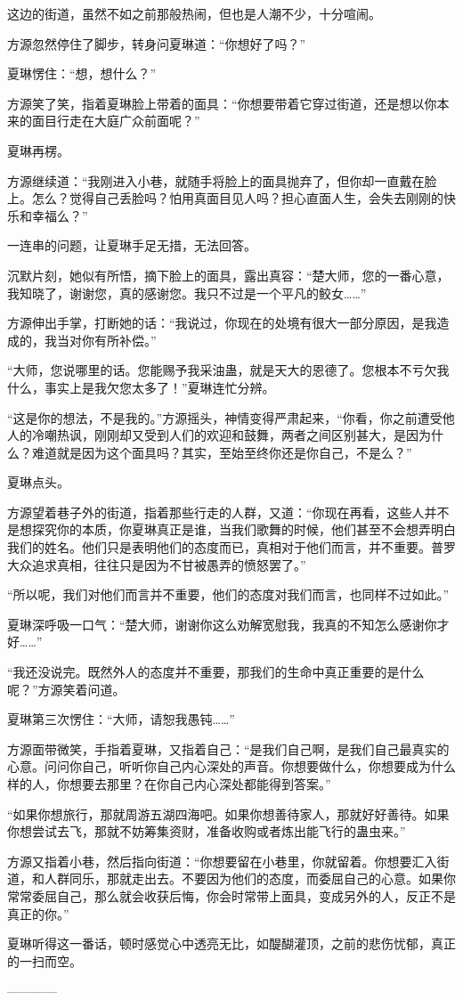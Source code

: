 \begin{this_body}
这边的街道，虽然不如之前那般热闹，但也是人潮不少，十分喧闹。

方源忽然停住了脚步，转身问夏琳道：“你想好了吗？”

夏琳愣住：“想，想什么？”

方源笑了笑，指着夏琳脸上带着的面具：“你想要带着它穿过街道，还是想以你本来的面目行走在大庭广众前面呢？”

夏琳再楞。

方源继续道：“我刚进入小巷，就随手将脸上的面具抛弃了，但你却一直戴在脸上。怎么？觉得自己丢脸吗？怕用真面目见人吗？担心直面人生，会失去刚刚的快乐和幸福么？”

一连串的问题，让夏琳手足无措，无法回答。

沉默片刻，她似有所悟，摘下脸上的面具，露出真容：“楚大师，您的一番心意，我知晓了，谢谢您，真的感谢您。我只不过是一个平凡的鲛女……”

方源伸出手掌，打断她的话：“我说过，你现在的处境有很大一部分原因，是我造成的，我当对你有所补偿。”

“大师，您说哪里的话。您能赐予我采油蛊，就是天大的恩德了。您根本不亏欠我什么，事实上是我欠您太多了！”夏琳连忙分辨。

“这是你的想法，不是我的。”方源摇头，神情变得严肃起来，“你看，你之前遭受他人的冷嘲热讽，刚刚却又受到人们的欢迎和鼓舞，两者之间区别甚大，是因为什么？难道就是因为这个面具吗？其实，至始至终你还是你自己，不是么？”

夏琳点头。

方源望着巷子外的街道，指着那些行走的人群，又道：“你现在再看，这些人并不是想探究你的本质，你夏琳真正是谁，当我们歌舞的时候，他们甚至不会想弄明白我们的姓名。他们只是表明他们的态度而已，真相对于他们而言，并不重要。普罗大众追求真相，往往只是因为不甘被愚弄的愤怒罢了。”

“所以呢，我们对他们而言并不重要，他们的态度对我们而言，也同样不过如此。”

夏琳深呼吸一口气：“楚大师，谢谢你这么劝解宽慰我，我真的不知怎么感谢你才好……”

“我还没说完。既然外人的态度并不重要，那我们的生命中真正重要的是什么呢？”方源笑着问道。

夏琳第三次愣住：“大师，请恕我愚钝……”

方源面带微笑，手指着夏琳，又指着自己：“是我们自己啊，是我们自己最真实的心意。问问你自己，听听你自己内心深处的声音。你想要做什么，你想要成为什么样的人，你想要去那里？在你自己内心深处都能得到答案。”

“如果你想旅行，那就周游五湖四海吧。如果你想善待家人，那就好好善待。如果你想尝试去飞，那就不妨筹集资财，准备收购或者炼出能飞行的蛊虫来。”

方源又指着小巷，然后指向街道：“你想要留在小巷里，你就留着。你想要汇入街道，和人群同乐，那就走出去。不要因为他们的态度，而委屈自己的心意。如果你常常委屈自己，那么就会收获后悔，你会时常带上面具，变成另外的人，反正不是真正的你。”

夏琳听得这一番话，顿时感觉心中透亮无比，如醍醐灌顶，之前的悲伤忧郁，真正的一扫而空。

------------

\end{this_body}

